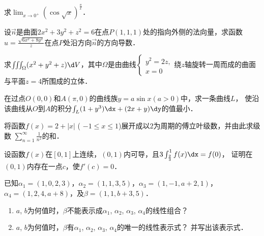 \documentclass[plain,noanswer,medmath]{../../template/jnuexam}
\begin{document}
\begin{problem}
求$\lim_{x \to 0^+} (\cos \sqrt{x})^{\frac{\pi}{x}}$．
\end{problem}


\begin{problem}
设$\vec{n}$是曲面$2x^2 + 3y^2 + z^2 = 6$在点$P(1,1,1)$处的指向外侧的法向量，求函数
$u = \frac{\sqrt{6x^2 + 8y^2}}{z}$在点$P$处沿方向$\vec{n}$的方向导数．
\end{problem}


\begin{problem}
求$\iiint_{\Omega}(x^2 + y^2 + z)\d V$，其中$\Omega$是由曲线$\begin{cases}
  y^2 = 2z, \\
  x = 0
\end{cases}$绕$z$轴旋转一周而成的曲面与平面$z = 4$所围成的立体．
\end{problem}



\begin{problem}
在过点$O(0,0)$和$A(\pi ,0)$的曲线族$y = a\sin x(a > 0)$中，求一条曲线$L$，
使沿该曲线从$O$到$A$的积分$\int_L (1 + y^3)\dx + (2x + y)\dy$的值最小．
\end{problem}



\begin{problem}
将函数$f(x) = 2 + |x|$ ( $- 1 \le x \le 1$)展开成以$2$为周期的傅立叶级数，并由此求级数
$\sum_{n = 1}^{\infty}\frac{1}{n^2}$的和．
\end{problem}



\begin{problem}
设函数$f(x)$在$[0,1]$上连续，$(0,1)$内可导，且$3\int_{\frac{2}{3}}^1f(x)\dx = f(0)$，
证明在$(0,1)$内存在一点$c$，使$f'(c) = 0$．
\end{problem}



\begin{problem}
已知$\alpha_1 = (1,0,2,3)$，$\alpha_2 = (1,1,3,5)$，$\alpha_3 = (1, - 1,a + 2,1)$，
$\alpha_4 = (1,2,4,a + 8)$，及$\beta = (1,1,b + 3,5)$．
\begin{enumerate}
\item $a$, $b$为何值时，$\beta$不能表示成$\alpha_1$, $\alpha_2$, $\alpha_3$, $\alpha_4$的线性组合？
\item $a$, $b$为何值时，$\beta$有$\alpha_1$, $\alpha_2$, $\alpha_3$, $\alpha_4$的唯一的线性表示式？
      并写出该表示式．
\end{enumerate}
\end{problem}
\end{document}
